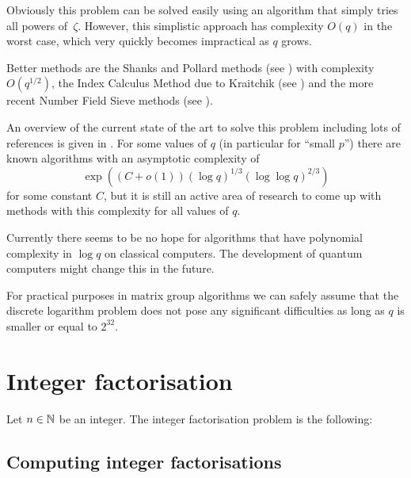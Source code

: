 Obviously this problem can be solved easily using an algorithm that
simply tries all powers of~$\zeta$. However, this simplistic approach
has complexity $O(q)$ in the worst case, which very quickly
becomes impractical as $q$ grows.

Better methods are the Shanks and Pollard methods (see 
%
\cite[Section~3]{odlyzkodlp}) with complexity $O(q^{1/2})$, 
the Index Calculus Method due to
%
Kraitchik (see \cite{McCurley}) and the more recent Number Field Sieve
methods (see \cite[Section~4]{odlyzkodlp}).
%

An overview of the current state of the art to solve this problem
including lots of references
is given in \cite{odlyzkodlp}. For some values of $q$ (in particular
for ``small $p$'') there are known
algorithms with an asymptotic complexity of
\[ \exp( (C+o(1)) (\log q)^{1/3} (\log \log q)^{2/3} ) \]
for some constant $C$,
but it is still an active area of research to come up with methods
with this complexity for all values of $q$.

Currently there seems to be no hope for algorithms that have
polynomial complexity in $\log q$ on classical computers. The development
of quantum computers might change this in the future.

For practical purposes in matrix group algorithms 
we can safely assume that the discrete logarithm
problem does not pose any significant difficulties as long as $q$ is
smaller or equal to $2^{32}$.
%

\section{Integer factorisation}
\label{intfact}
%

\begin{Problem}
%
    Let $n \in \mathbb{N}$ be an integer.
    The integer factorisation problem is the following:

    \begin{center}
\end{center}
\end{Problem}

\subsection*{Computing integer factorisations}
%

